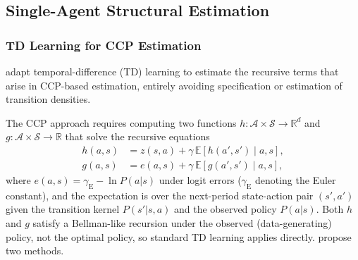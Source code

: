 \subsection{Single-Agent Structural Estimation}

\subsubsection{TD Learning for CCP Estimation}

\citet{AdusumilliEckardt2022} adapt temporal-difference (TD) learning to estimate the recursive terms that arise in CCP-based estimation, entirely avoiding specification or estimation of transition densities.

The CCP approach requires computing two functions $h: \mathcal{A} \times \mathcal{S} \to \mathbb{R}^d$ and $g: \mathcal{A} \times \mathcal{S} \to \mathbb{R}$ that solve the recursive equations
\begin{align}
h(a,s) &= z(s,a) + \gamma \, \mathbb{E}[h(a', s') \mid a, s], \label{eq:ae_h}\\
g(a,s) &= e(a,s) + \gamma \, \mathbb{E}[g(a', s') \mid a, s], \label{eq:ae_g}
\end{align}
where $e(a,s) = \gamma_{\text{E}} - \ln P(a|s)$ under logit errors ($\gamma_{\text{E}}$ denoting the Euler constant), and the expectation is over the next-period state-action pair $(s', a')$ given the transition kernel $P(s'|s,a)$ and the observed policy $P(a|s)$. Both $h$ and $g$ satisfy a Bellman-like recursion under the observed (data-generating) policy, not the optimal policy, so standard TD learning applies directly. \citet{AdusumilliEckardt2022} propose two methods.

